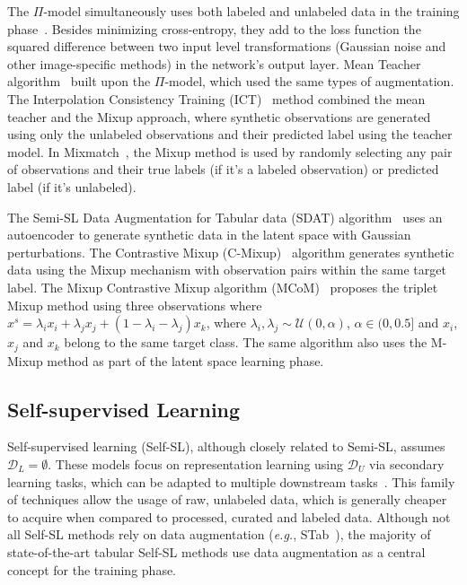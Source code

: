 The $\Pi$-model simultaneously uses both labeled and unlabeled data in the
training phase~\cite{samuli2017temporal}. Besides minimizing cross-entropy,
they add to the loss function the squared difference between two input level
transformations (Gaussian noise and other image-specific methods) in the
network's output layer. Mean Teacher algorithm~\cite{tarvainen2017mean} built
upon the $\Pi$-model, which used the same types of augmentation. The
Interpolation Consistency Training (ICT)~\cite{verma2022interpolation} method
combined the mean teacher and the Mixup approach, where synthetic observations
are generated using only the unlabeled observations and their predicted label
using the teacher model. In Mixmatch~\cite{berthelot2019mixmatch}, the Mixup
method is used by randomly selecting any pair of observations and their true
labels (if it's a labeled observation) or predicted label (if it's unlabeled).

The Semi-SL Data Augmentation for Tabular data (SDAT)
algorithm~\cite{fang2022semi} uses an autoencoder to generate synthetic data
in the latent space with Gaussian perturbations. The Contrastive Mixup
(C-Mixup)~\cite{darabi2021contrastive} algorithm generates synthetic data
using the Mixup mechanism with observation pairs within the same target label.
The Mixup Contrastive Mixup algorithm (MCoM)~\cite{li2022mcom} proposes the
triplet Mixup method using three observations where $x^s = \lambda_ix_i +
\lambda_jx_j + (1-\lambda_i-\lambda_j)x_k$, where $\lambda_i, \lambda_j \sim
\mathcal{U}(0, \alpha)$, $\alpha \in (0, 0.5]$ and $x_i$, $x_j$ and $x_k$
belong to the same target class. The same algorithm also uses the M-Mixup
method as part of the latent space learning phase.


\subsection{Self-supervised Learning}\label{sec:self-supervised-learning-synth}

Self-supervised learning (Self-SL), although closely related to Semi-SL,
assumes $\mathcal{D}_L = \emptyset$. These models focus
on representation learning using $\mathcal{D}_U$ via secondary learning
tasks, which can be adapted to multiple downstream
tasks~\cite{liu2021self}. This family of techniques allow the usage of raw,
unlabeled data, which is generally cheaper to acquire when compared to
processed, curated and labeled data. Although not all Self-SL methods rely on
data augmentation (\textit{e.g.}, STab~\cite{hajiramezanali2022stab}), the
majority of state-of-the-art tabular Self-SL methods use data augmentation as
a central concept for the training phase.

